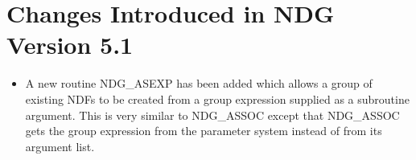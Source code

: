 \documentclass[twoside,11pt,nolof]{starlink}
\begin{document}
\section{Changes Introduced in NDG Version 5.1}
\begin{itemize}
   \item A new routine NDG\_ASEXP has been added which allows a group of
         existing NDFs to be created from a group expression supplied as
         a subroutine argument. This is very similar to NDG\_ASSOC except
         that NDG\_ASSOC gets the group expression from the parameter system
         instead of from its argument list.
\end{itemize}
\end{document}
